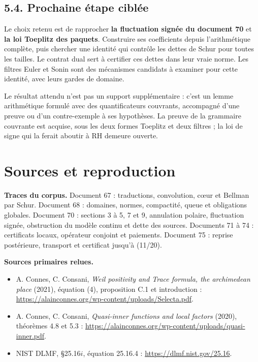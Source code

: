 \documentclass[
  10pt,
  a4paper,
]{article}
\providecommand{\tightlist}{%
  \setlength{\itemsep}{0pt}\setlength{\parskip}{0pt}}
\begin{document}
\hypertarget{prochaine-uxe9tape-cibluxe9e}{%
\subsection{5.4. Prochaine étape
ciblée}\label{prochaine-uxe9tape-cibluxe9e}}

Le choix retenu est de rapprocher \textbf{la fluctuation signée du
document 70} et \textbf{la loi Toeplitz des paquets}. Construire ses
coefficients depuis l'arithmétique complète, puis chercher une identité
qui contrôle les dettes de Schur pour toutes les tailles. Le contrat
dual sert à certifier ces dettes dans leur vraie norme. Les filtres
Euler et Sonin sont des mécanismes candidats à examiner pour cette
identité, avec leurs gardes de domaine.

Le résultat attendu n'est pas un support supplémentaire : c'est un lemme
arithmétique formulé avec des quantificateurs couvrants, accompagné
d'une preuve ou d'un contre-exemple à ses hypothèses. La preuve de la
grammaire couvrante est acquise, sous les deux formes Toeplitz et deux
filtres ; la loi de signe qui la ferait aboutir à RH demeure ouverte.

\hypertarget{sources-et-reproduction}{%
\section{Sources et reproduction}\label{sources-et-reproduction}}

\textbf{Traces du corpus.} Document 67 : traductions, convolution, cœur
et Bellman par Schur. Document 68 : domaines, normes, compactité, queue
et obligations globales. Document 70 : sections 3 à 5, 7 et 9,
annulation polaire, fluctuation signée, obstruction du modèle continu et
dette des sources. Documents 71 à 74 : certificats locaux, opérateur
conjoint et paiements. Document 75 : reprise postérieure, transport et
certificat jusqu'à (11/20).

\textbf{Sources primaires relues.}

\begin{itemize}
\tightlist
\item
  A. Connes, C. Consani, \emph{Weil positivity and Trace formula, the
  archimedean place} (2021), équation (4), proposition C.1 et
  introduction :
  \url{https://alainconnes.org/wp-content/uploads/Selecta.pdf}.
\item
  A. Connes, C. Consani, \emph{Quasi-inner functions and local factors}
  (2020), théorèmes 4.8 et 5.3 :
  \url{https://alainconnes.org/wp-content/uploads/quasi-inner.pdf}.
\item
  NIST DLMF, §25.16\(i\), équation 25.16.4 :
  \url{https://dlmf.nist.gov/25.16}.
\end{itemize}
\end{document}
